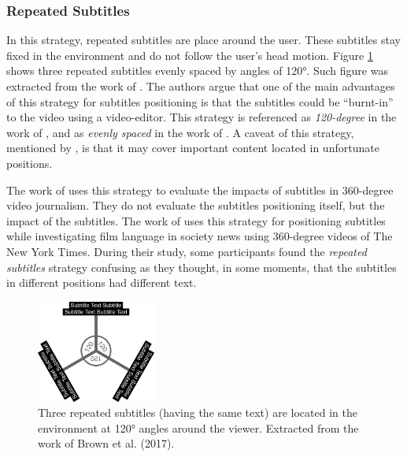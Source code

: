 \subsubsection{Repeated Subtitles}
\label{subsubsection:repeated_subtitles}

In this strategy, repeated subtitles are place around the user. These subtitles stay fixed in the environment and do not follow the user's head motion. Figure \ref{fig:120_subtitles} shows three repeated subtitles evenly spaced by angles of 120°. Such figure was extracted from the work of \cite{brown_subtitles_2017}. The authors argue that one of the main advantages of this strategy for subtitles positioning is that the subtitles could be ``burnt-in'' to the video using a video-editor. This strategy is referenced as \emph{120-degree} in the work of \cite{brown_subtitles_2017}, and as \emph{evenly spaced} in the work of \cite{montagud_culture_2020}. A caveat of this strategy, mentioned by \cite{brown_subtitles_2017}, is that it may cover important content located in unfortunate positions. 

The work of \cite{li_impacts_2018} uses this strategy to evaluate the impacts of subtitles in 360-degree video journalism. They do not evaluate the subtitles positioning itself, but the impact of the subtitles. The work of \cite{chen_film_2017} uses this strategy for positioning subtitles while investigating film language in society news using 360-degree videos of The New York Times. During their study, some participants found the \emph{repeated subtitles} strategy confusing as they thought, in some moments, that the subtitles in different positions had different text.

\begin{figure}[!ht]
    \centering
    \includegraphics[width=0.35\textwidth]{img/video360/120_subtitles.png}
    \caption{Three repeated subtitles (having the same text) are located in the environment at 120° angles around the viewer. Extracted from the work of Brown et al. (2017).}
    \label{fig:120_subtitles}
\end{figure}


